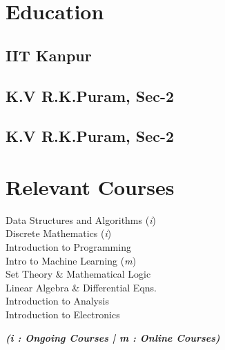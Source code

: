\documentclass[]{deedy-resume-openfont}
\begin{document}
\begin{minipage}[t]{0.31\textwidth} 


\section{Education} 

\subsection{IIT Kanpur}
\sectionsep{}

\subsection{K.V R.K.Puram, Sec-2}
\sectionsep{}

\subsection{K.V R.K.Puram, Sec-2}


\section{Relevant Courses}
Data Structures and Algorithms (\textit{i}) \\
Discrete Mathematics (\textit{i}) \\
Introduction to Programming \\
Intro to Machine Learning (\textit{m}) \\
Set Theory \& Mathematical Logic \\
Linear Algebra \& Differential Eqns. \\
Introduction to Analysis \\
Introduction to Electronics

{\footnotesize \textit{\textbf{ (i : Ongoing Courses | m : Online Courses)}}}



\end{minipage}
\end{document}
